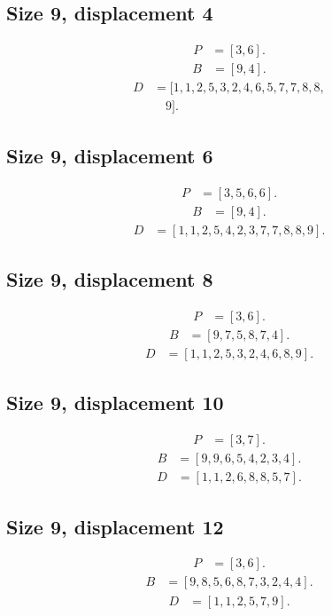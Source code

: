 \documentclass[11pt,a4paper]{article}
\theoremstyle{definition}\newtheorem{definition}[theorem]{Definition}
\theoremstyle{remark}\newtheorem{remark}[theorem]{Remark}
\begin{document}
\subsection*{Size 9, displacement 4}
\[\begin{aligned}
P&=[3,6].
\end{aligned}\]
\[\begin{aligned}
B&=[9,4].
\end{aligned}\]
\[\begin{aligned}
D&=[1,1,2,5,3,2,4,6,5,7,7,8,8,\\
&\quad 9].
\end{aligned}\]
\subsection*{Size 9, displacement 6}
\[\begin{aligned}
P&=[3,5,6,6].
\end{aligned}\]
\[\begin{aligned}
B&=[9,4].
\end{aligned}\]
\[\begin{aligned}
D&=[1,1,2,5,4,2,3,7,7,8,8,9].
\end{aligned}\]
\subsection*{Size 9, displacement 8}
\[\begin{aligned}
P&=[3,6].
\end{aligned}\]
\[\begin{aligned}
B&=[9,7,5,8,7,4].
\end{aligned}\]
\[\begin{aligned}
D&=[1,1,2,5,3,2,4,6,8,9].
\end{aligned}\]
\subsection*{Size 9, displacement 10}
\[\begin{aligned}
P&=[3,7].
\end{aligned}\]
\[\begin{aligned}
B&=[9,9,6,5,4,2,3,4].
\end{aligned}\]
\[\begin{aligned}
D&=[1,1,2,6,8,8,5,7].
\end{aligned}\]
\subsection*{Size 9, displacement 12}
\[\begin{aligned}
P&=[3,6].
\end{aligned}\]
\[\begin{aligned}
B&=[9,8,5,6,8,7,3,2,4,4].
\end{aligned}\]
\[\begin{aligned}
D&=[1,1,2,5,7,9].
\end{aligned}\]
\end{document}
